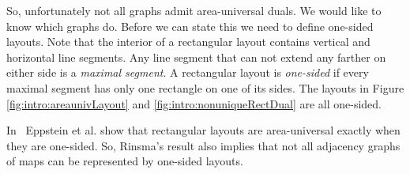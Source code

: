   So, unfortunately not all graphs admit area-universal duals.
  We would like to know which graphs do.
  Before we can state this we need to define one-sided layouts.
  Note that the interior of a rectangular layout contains vertical and horizontal line segments.
  Any line segment that can not extend any farther on either side is a \emph{maximal segment}.
  A rectangular layout is \emph{one-sided} if every maximal segment has only one rectangle on one of its sides.
  The layouts in Figure \ref{fig:intro:areaunivLayout} and  \ref{fig:intro:nonuniqueRectDual} are all one-sided.

  In~\cite{Eppstein2012} Eppstein et al. show that rectangular layouts are area-universal exactly when they are one-sided.
  So, Rinsma's result also implies that not all adjacency graphs of maps can be represented by one-sided layouts.


